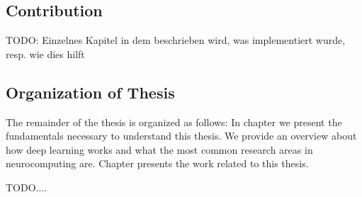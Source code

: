 \subsection{Contribution}
TODO: Einzelnes Kapitel in dem beschrieben wird, was implementiert wurde, resp. wie dies hilft

\subsection{Organization of Thesis}
The remainder of the thesis is organized as follows: In chapter  we present the fundamentals necessary to understand this thesis. We provide an overview about how deep learning works and what the most common research areas in neurocomputing are. Chapter  presents the work related to this thesis.

TODO....



